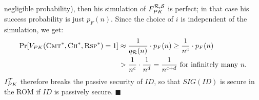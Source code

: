 negligible probability), then his simulation of $F^{\mathcal{R},\mathcal{S}}_{PK}$ is
perfect; in that case his success probability is just $p_F(n)$. 
Since the choice of $i$ is independent of the simulation, we get:
\begin{align*}
\text{Pr}[V_{PK}(\textsc{Cmt}^*,\textsc{Ch}^*,\textsc{Rsp}^*) = 1] &\approx
\frac{1}{q_{\mathcal{R}}(n)}\cdot p_F(n) \geq \frac{1}{n^c}\cdot p_F(n) \\ 
& > \frac{1}{n^c}\cdot \frac{1}{n^d} = \frac{1}{n^{c+d}}
\text{ for infinitely many } n.
\end{align*}
$I_{PK}^{\mathcal{T}}$ therefore breaks the passive security of $ID$, 
so that $SIG(ID)$ is secure in the ROM if $ID$ is passively secure.
$\blacksquare$
